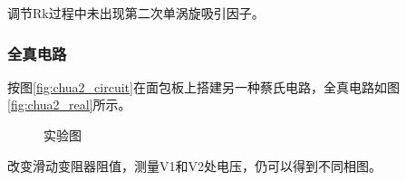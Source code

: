 \documentclass[10pt,a4paper,twoside,UTF8]{ctexart}
\begin{document}
调节Rk过程中未出现第二次单涡旋吸引因子。

\subsubsection{全真电路}
按图\ref{fig:chua2_circuit}在面包板上搭建另一种蔡氏电路，全真电路如图\ref{fig:chua2_real}所示。
\begin{figure}[H]
	\centering
	\caption{实验图}
\end{figure}

改变滑动变阻器阻值，测量V1和V2处电压，仍可以得到不同相图。
\end{document}
